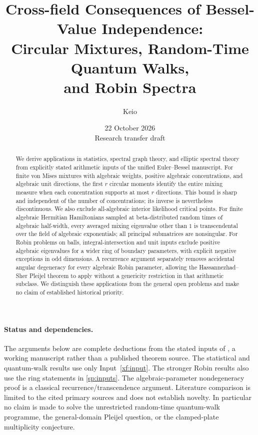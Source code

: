 \documentclass[11pt]{article}
\title{Cross-field Consequences of Bessel-Value Independence:\\
Circular Mixtures, Random-Time Quantum Walks,\\and Robin Spectra}
\author{Keio}
\date{22 October 2026\\\small Research transfer draft}
\theoremstyle{definition}
\theoremstyle{remark}
\begin{document}
\maketitle
\begin{abstract}
We derive applications in statistics, spectral graph theory, and elliptic
spectral theory from explicitly stated arithmetic inputs of the unified
Euler--Bessel manuscript. For finite von Mises mixtures with algebraic
weights, positive algebraic concentrations, and algebraic unit directions,
the first $r$ circular moments identify the entire mixing measure when
each concentration supports at most $r$ directions. This bound is sharp
and independent of the number of concentrations; its inverse is nevertheless
discontinuous. We also exclude all-algebraic interior likelihood critical
points. For finite algebraic Hermitian Hamiltonians sampled at beta-distributed
random times of algebraic half-width, every averaged mixing eigenvalue
other than $1$ is transcendental over the field of algebraic exponentials;
all principal submatrices are nonsingular. For Robin problems on balls,
integral-intersection and unit inputs exclude positive algebraic eigenvalues
for a wider ring of boundary parameters, with explicit negative exceptions
in odd dimensions. A recurrence argument separately removes accidental
angular degeneracy for every algebraic Robin parameter, allowing the
Hassannezhad--Sher Pleijel theorem to apply without a genericity restriction
in that arithmetic subclass. We distinguish these applications from the
general open problems and make no claim of established historical priority.
\end{abstract}

\paragraph{Status and dependencies.}
The arguments below are complete deductions from the stated inputs of
\cite{Unified}, a working manuscript rather than a published theorem source.
The statistical and quantum-walk results use only Input~\ref{xf:input}.
The stronger Robin results also use the ring statements in
\eqref{sp:inputs}. The algebraic-parameter nondegeneracy proof is a
classical recurrence/transcendence argument. Literature comparison is
limited to the cited primary sources and does not establish novelty.
In particular no claim is made to solve the unrestricted random-time
quantum-walk programme, the general-domain Pleijel question, or the
clamped-plate multiplicity conjecture.
\end{document}
